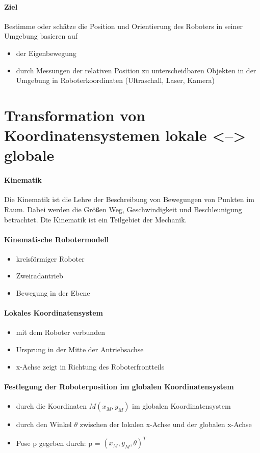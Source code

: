 \paragraph{Ziel} Bestimme oder schätze die Position und Orientierung des Roboters in seiner Umgebung basieren auf
\begin{itemize}
	\item der Eigenbewegung
	\item durch Messungen der relativen Position zu unterscheidbaren Objekten in der Umgebung in Roboterkoordinaten (Ultraschall, Laser, Kamera)
\end{itemize}
\section{Transformation von Koordinatensystemen lokale <--> globale}
\paragraph{Kinematik} Die Kinematik ist die Lehre der Beschreibung von Bewegungen von Punkten im Raum. Dabei werden die Größen Weg, Geschwindigkeit und Beschleunigung betrachtet. Die Kinematik ist ein Teilgebiet der Mechanik.
\paragraph{Kinematische Robotermodell}
\begin{itemize}
	\item kreisförmiger Roboter
	\item Zweiradantrieb
	\item Bewegung in der Ebene
\end{itemize}
\paragraph{Lokales Koordinatensystem}
\begin{itemize}
	\item mit dem Roboter verbunden
	\item Ursprung in der Mitte der Antriebsachse
	\item x-Achse zeigt in Richtung des Roboterfrontteils
\end{itemize}
\paragraph{Festlegung der Roboterposition im globalen Koordinatensystem}
\begin{itemize}
	\item durch die Koordinaten $M(x_{M}, y_{M})$ im globalen Koordinatensystem
	\item durch den Winkel $\theta$ zwischen der lokalen x-Achse und der globalen x-Achse
	\item Pose p gegeben durch: p = $(x_M, y_M, \theta)^{T}$
\end{itemize}
